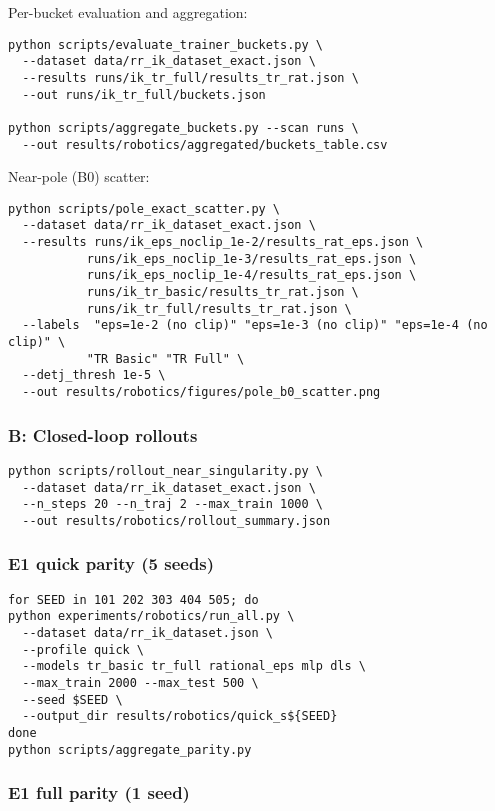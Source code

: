\documentclass[11pt,twoside]{article}
\begin{document}
Per-bucket evaluation and aggregation:
\begin{verbatim}
python scripts/evaluate_trainer_buckets.py \
  --dataset data/rr_ik_dataset_exact.json \
  --results runs/ik_tr_full/results_tr_rat.json \
  --out runs/ik_tr_full/buckets.json

python scripts/aggregate_buckets.py --scan runs \
  --out results/robotics/aggregated/buckets_table.csv
\end{verbatim}

Near-pole (B0) scatter:
\begin{verbatim}
python scripts/pole_exact_scatter.py \
  --dataset data/rr_ik_dataset_exact.json \
  --results runs/ik_eps_noclip_1e-2/results_rat_eps.json \
           runs/ik_eps_noclip_1e-3/results_rat_eps.json \
           runs/ik_eps_noclip_1e-4/results_rat_eps.json \
           runs/ik_tr_basic/results_tr_rat.json \
           runs/ik_tr_full/results_tr_rat.json \
  --labels  "eps=1e-2 (no clip)" "eps=1e-3 (no clip)" "eps=1e-4 (no clip)" \
           "TR Basic" "TR Full" \
  --detj_thresh 1e-5 \
  --out results/robotics/figures/pole_b0_scatter.png
\end{verbatim}

\subsubsection{B: Closed-loop rollouts}

\begin{verbatim}
python scripts/rollout_near_singularity.py \
  --dataset data/rr_ik_dataset_exact.json \
  --n_steps 20 --n_traj 2 --max_train 1000 \
  --out results/robotics/rollout_summary.json
\end{verbatim}

\subsubsection{E1 quick parity (5 seeds)}

\begin{verbatim}
for SEED in 101 202 303 404 505; do
python experiments/robotics/run_all.py \
  --dataset data/rr_ik_dataset.json \
  --profile quick \
  --models tr_basic tr_full rational_eps mlp dls \
  --max_train 2000 --max_test 500 \
  --seed $SEED \
  --output_dir results/robotics/quick_s${SEED}
done
python scripts/aggregate_parity.py
\end{verbatim}

\subsubsection{E1 full parity (1 seed)}
\end{document}
